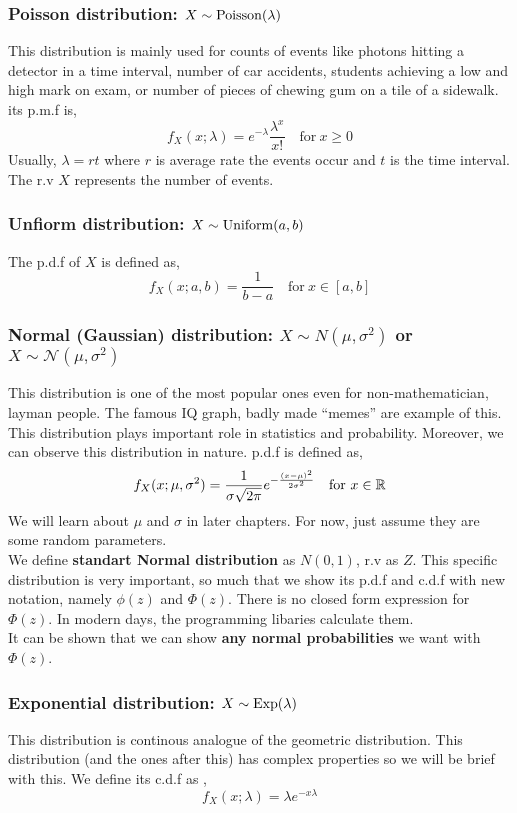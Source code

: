 \subsubsection*{Poisson distribution: $X \sim \operatorname{Poisson}(\lambda)$}
This distribution is mainly used for counts of events like photons hitting a detector in a time interval, number of car accidents, students achieving a low and high mark on exam, or number of pieces of chewing gum on a tile of a sidewalk. its p.m.f is,
\[f_X(x; \lambda) = e^{-\lambda} \frac{\lambda^{x}}{x!} \quad \text{for} \ x \ge 0 \]
Usually, $\lambda = rt$ where $r$ is average rate the events occur and $t$ is the time interval. The r.v $X$ represents the number of events.
\subsubsection*{Unfiorm distribution: $X \sim \operatorname{Uniform}(a,b)$}
The p.d.f of $X$ is defined as,
\[f_X(x; a,b)= \frac{1}{b-a} \quad \text{for} \ x \in [a,b]\]
\subsubsection*{Normal (Gaussian) distribution: $X \sim N(\mu, \sigma^2)$ or $X \sim \mathcal{N}(\mu, \sigma^2)$}
This distribution is one of the most popular ones even for non-mathematician, layman people. The famous IQ graph, badly made ``memes'' are example of this. This distribution plays important role in statistics and probability. Moreover, we can observe this distribution in nature. p.d.f is defined as,
\[f_X(x; \mu, \sigma^2) = \frac{1}{\sigma \sqrt{2 \pi}}  e^{- \frac{(x- \mu)^2}{2\sigma^2}} \quad \text{for} \ x \in {\mathbb{R}} \]
We will learn about $\mu$ and $\sigma$ in later chapters. For now, just assume they are some random parameters. \\
We define  \textbf{standart Normal distribution} as $N(0,1)$, r.v as $Z$. This specific distribution is very important, so much that we show its p.d.f and c.d.f with new notation, namely $\phi(z)$ and $\Phi(z)$. There is no closed form expression for $\Phi(z)$. In modern days, the programming libaries calculate them. \\
It can be shown that we can show \textbf{any normal  probabilities} we want with $\Phi(z)$.
\subsubsection*{Exponential distribution: $X \sim \operatorname{Exp}(\lambda)$}
This distribution is continous analogue of the geometric distribution. This distribution (and the ones after this) has complex properties so we will be brief with this.
We define its c.d.f as ,
\[f_X(x; \lambda) = \lambda e^{-x \lambda}\]
